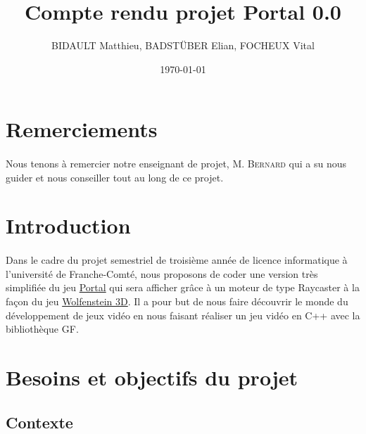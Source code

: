 \documentclass[12pt]{report}
\title{Compte rendu projet Portal 0.0}
\author{BIDAULT Matthieu, BADSTÜBER Elian, FOCHEUX Vital}
\date{\today}
\begin{document}
\maketitle

\section*{Remerciements}

\paragraph{}
Nous tenons à remercier notre enseignant de projet, M. \textsc{Bernard} 
qui a su nous guider et nous conseiller tout au long de ce projet.


\tableofcontents

\section{Introduction}

\paragraph{}

Dans le cadre du projet semestriel de troisième année de licence
informatique à l'université de Franche-Comté, nous proposons de coder
une version très simplifiée du jeu \href{https://fr.wikipedia.org/wiki/Portal_(jeu_vid%C3%A9o)}{Portal}
qui sera afficher grâce à un moteur de type Raycaster à la façon du jeu
\href{https://fr.wikipedia.org/wiki/Wolfenstein_3D}{Wolfenstein 3D}.
Il a pour but de nous faire découvrir le monde du développement de jeux 
vidéo en nous faisant réaliser un jeu vidéo en C++ avec la bibliothèque 
GF.


\section{Besoins et objectifs du projet}
\subsection{Contexte}
\end{document}
